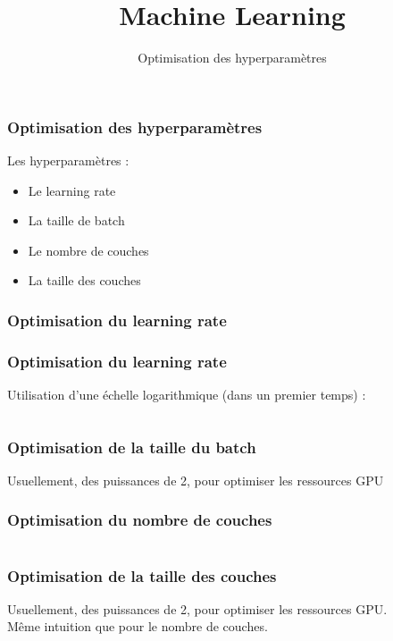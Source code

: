 \documentclass{formation}
\title{Machine Learning}
\subtitle{Optimisation des hyperparamètres}
\begin{document}
\maketitle

\begin{frame}
  \frametitle{Optimisation des hyperparamètres}
  \begin{minipage}[l]{0.49\linewidth}
  \end{minipage}\hfill
  \begin{minipage}[l]{0.49\linewidth}
  Les hyperparamètres :
  \begin{itemize}
  \item Le learning rate
  \item La taille de batch
  \item Le nombre de couches
  \item La taille des couches
  \end{itemize}
  \end{minipage}\hfill
\end{frame}

\begin{frame}
  \frametitle{Optimisation du learning rate}
\end{frame}

\begin{frame}
  \frametitle{Optimisation du learning rate}
  Utilisation d'une échelle logarithmique (dans un premier temps) :
  \inputminted[linenos,fontsize=\small,bgcolor=pythonbg]{python}{code-illustration/gridsearch-template.py}
\end{frame}

\begin{frame}
  \frametitle{Optimisation de la taille du batch}
  Usuellement, des puissances de 2, pour optimiser les ressources GPU
\end{frame}

\begin{frame}
  \frametitle{Optimisation du nombre de couches}
  \inputminted[linenos,fontsize=\small,bgcolor=pythonbg]{python}{code-illustration/addlayer-template.py}
\end{frame}

\begin{frame}
  \frametitle{Optimisation de la taille des couches}
  Usuellement, des puissances de 2, pour optimiser les ressources GPU. \\
  Même intuition que pour le nombre de couches.
\end{frame}
\end{document}
